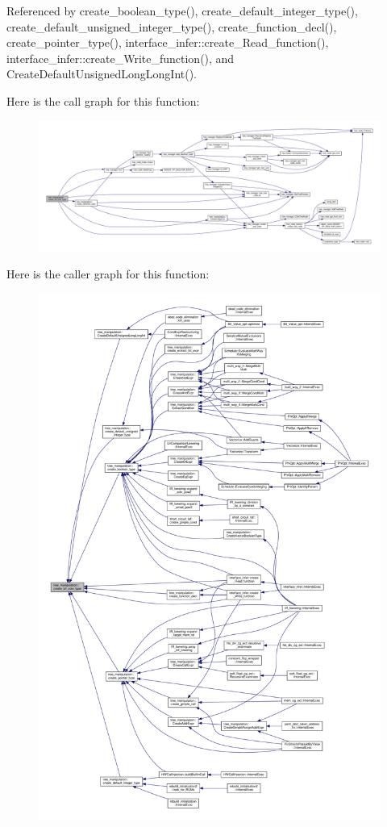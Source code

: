 Referenced by create\+\_\+boolean\+\_\+type(), create\+\_\+default\+\_\+integer\+\_\+type(), create\+\_\+default\+\_\+unsigned\+\_\+integer\+\_\+type(), create\+\_\+function\+\_\+decl(), create\+\_\+pointer\+\_\+type(), interface\+\_\+infer\+::create\+\_\+\+Read\+\_\+function(), interface\+\_\+infer\+::create\+\_\+\+Write\+\_\+function(), and Create\+Default\+Unsigned\+Long\+Long\+Int().

Here is the call graph for this function\+:
\nopagebreak
\begin{figure}[H]
\begin{center}
\leavevmode
\includegraphics[width=350pt]{d0/d99/classtree__manipulation_a33b3d06e9207b3d28daf9807a6549d2f_cgraph}
\end{center}
\end{figure}
Here is the caller graph for this function\+:
\nopagebreak
\begin{figure}[H]
\begin{center}
\leavevmode
\includegraphics[width=350pt]{d0/d99/classtree__manipulation_a33b3d06e9207b3d28daf9807a6549d2f_icgraph}
\end{center}
\end{figure}

